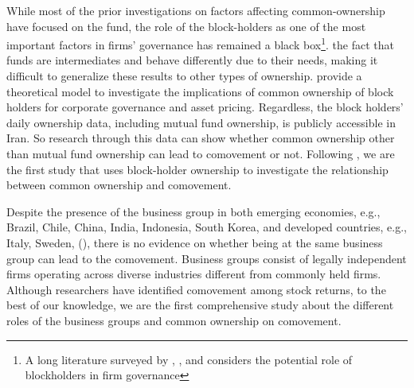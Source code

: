 While most of the prior investigations on factors affecting common-ownership have focused on the fund, the role of the block-holders as one of the most important factors in firms' governance has remained a black box\footnote{A long literature surveyed by \cite{holderness2003survey}, \cite{edmans2014blockholders}, and \cite{edmans2017blockholders} considers the potential role of blockholders in firm governance}. 
the fact that funds are intermediates and behave differently due to their needs, making it difficult to generalize these results to other types of ownership. \cite{edmans2014governance} provide a theoretical model to investigate the implications of common ownership of block holders for corporate governance and asset pricing. Regardless, the block holders' daily ownership data, including mutual fund ownership, is publicly accessible in Iran. So research through this data can show whether common ownership other than mutual fund ownership can lead to comovement or not. Following \cite{AntonPolk}, we are the first study that uses block-holder ownership to investigate the relationship between common ownership and comovement.
	
	

Despite the presence of the business group in both emerging economies, e.g., Brazil, Chile, China, India, Indonesia, South Korea, and developed countries, e.g., Italy, Sweden, (\cite{khanna2007business}), there is no evidence on whether being at the same business group can lead to the comovement. Business groups consist of legally independent firms operating across diverse industries different from commonly held firms. Although researchers have identified comovement among stock
returns,  to the best of our knowledge, we are the first comprehensive study about the different roles of the business groups and common ownership on comovement. 




%	
%	


